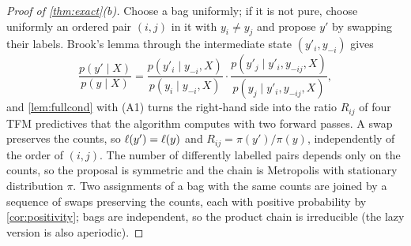\begin{proof}[Proof of \cref{thm:exact}(b)]
Choose a bag uniformly; if it is not pure, choose uniformly an ordered pair $(i,j)$ in it with $y_i\neq y_j$ and propose
$y'$ by swapping their labels. Brook's lemma through the intermediate state $(y'_i,y_{-i})$ gives
\[
\frac{p(y'\mid X)}{p(y\mid X)}=\frac{p(y'_i\mid y_{-i},X)}{p(y_i\mid y_{-i},X)}\cdot\frac{p(y'_j\mid y'_i,y_{-ij},X)}{p(y_j\mid y'_i,y_{-ij},X)},
\]
and \cref{lem:fullcond} with (A1) turns the right-hand side into the ratio $R_{ij}$ of four TFM predictives that the
algorithm computes with two forward passes. A swap preserves the counts, so $\ell(y')=\ell(y)$ and $R_{ij}=\pi(y')/\pi(y)$,
independently of the order of $(i,j)$. The number of differently labelled pairs depends only on the counts, so the
proposal is symmetric and the chain is Metropolis with stationary distribution $\pi$. Two assignments of a bag with
the same counts are joined by a sequence of swaps preserving the counts, each with positive probability by
\cref{cor:positivity}; bags are independent, so the product chain is irreducible (the lazy version is also aperiodic).
\end{proof}


